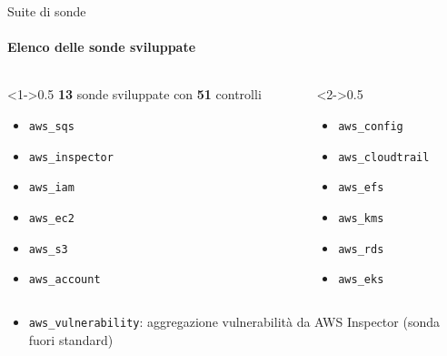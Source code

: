 \documentclass{beamer}
\begin{document}
\begin{frame}{Suite di sonde}
    \framesubtitle{Elenco delle sonde sviluppate}
    \begin{columns}
        \begin{column}<1->{0.5\textwidth}
            \textbf{13} sonde sviluppate con \textbf{51} controlli
            \begin{itemize}
                \item \texttt{aws\_sqs}
                \item \texttt{aws\_inspector}
                \item \texttt{aws\_iam}
                \item \texttt{aws\_ec2}
                \item \texttt{aws\_s3}
                \item \texttt{aws\_account}
            \end{itemize}
        \end{column}
        \begin{column}<2->{0.5\textwidth}
            \begin{itemize}
                \item \texttt{aws\_config}
                \item \texttt{aws\_cloudtrail}
                \item  \texttt{aws\_efs}
                \item  \texttt{aws\_kms}
                \item  \texttt{aws\_rds}
                \item  \texttt{aws\_eks}
            \end{itemize}
        \end{column}
    \end{columns}
    \vspace{1em}
    \begin{itemize}
        \item <3-> \texttt{aws\_vulnerability}: aggregazione vulnerabilità da AWS Inspector (sonda fuori standard)
    \end{itemize}
\end{frame}
\end{document}
